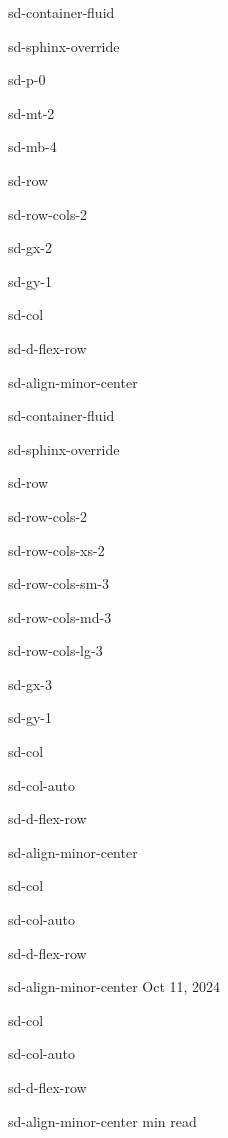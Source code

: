 \documentclass[letterpaper,10pt,english]{jupyterBook}
\begin{document}
\begin{sphinxuseclass}{sd-container-fluid}
\begin{sphinxuseclass}{sd-sphinx-override}
\begin{sphinxuseclass}{sd-p-0}
\begin{sphinxuseclass}{sd-mt-2}
\begin{sphinxuseclass}{sd-mb-4}
\begin{sphinxuseclass}{sd-row}
\begin{sphinxuseclass}{sd-row-cols-2}
\begin{sphinxuseclass}{sd-gx-2}
\begin{sphinxuseclass}{sd-gy-1}
\begin{sphinxuseclass}{sd-col}
\begin{sphinxuseclass}{sd-d-flex-row}
\begin{sphinxuseclass}{sd-align-minor-center}
\begin{sphinxuseclass}{sd-container-fluid}
\begin{sphinxuseclass}{sd-sphinx-override}
\begin{sphinxuseclass}{sd-row}
\begin{sphinxuseclass}{sd-row-cols-2}
\begin{sphinxuseclass}{sd-row-cols-xs-2}
\begin{sphinxuseclass}{sd-row-cols-sm-3}
\begin{sphinxuseclass}{sd-row-cols-md-3}
\begin{sphinxuseclass}{sd-row-cols-lg-3}
\begin{sphinxuseclass}{sd-gx-3}
\begin{sphinxuseclass}{sd-gy-1}
\begin{sphinxuseclass}{sd-col}
\begin{sphinxuseclass}{sd-col-auto}
\begin{sphinxuseclass}{sd-d-flex-row}
\begin{sphinxuseclass}{sd-align-minor-center}
\end{sphinxuseclass}
\end{sphinxuseclass}
\end{sphinxuseclass}
\end{sphinxuseclass}
\begin{sphinxuseclass}{sd-col}
\begin{sphinxuseclass}{sd-col-auto}
\begin{sphinxuseclass}{sd-d-flex-row}
\begin{sphinxuseclass}{sd-align-minor-center}
\sphinxAtStartPar
Oct 11, 2024

\end{sphinxuseclass}
\end{sphinxuseclass}
\end{sphinxuseclass}
\end{sphinxuseclass}
\begin{sphinxuseclass}{sd-col}
\begin{sphinxuseclass}{sd-col-auto}
\begin{sphinxuseclass}{sd-d-flex-row}
\begin{sphinxuseclass}{sd-align-minor-center}
 min read


\end{sphinxuseclass}
\end{sphinxuseclass}
\end{sphinxuseclass}
\end{sphinxuseclass}
\end{sphinxuseclass}
\end{sphinxuseclass}
\end{sphinxuseclass}
\end{sphinxuseclass}
\end{sphinxuseclass}
\end{sphinxuseclass}
\end{sphinxuseclass}
\end{sphinxuseclass}
\end{sphinxuseclass}
\end{sphinxuseclass}
\end{sphinxuseclass}
\end{sphinxuseclass}
\end{sphinxuseclass}
\end{sphinxuseclass}
\end{sphinxuseclass}
\end{sphinxuseclass}
\end{sphinxuseclass}
\end{sphinxuseclass}
\end{sphinxuseclass}
\end{sphinxuseclass}
\end{sphinxuseclass}
\end{sphinxuseclass}
\end{document}
